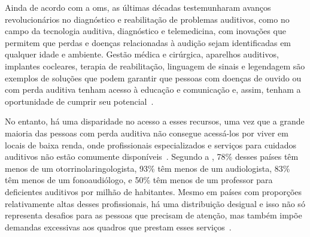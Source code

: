 Ainda de acordo com a \acrshort{oms}, as últimas décadas testemunharam avanços revolucionários no diagnóstico e reabilitação de problemas auditivos, como no campo da tecnologia auditiva, diagnóstico e telemedicina, com inovações que permitem que perdas e doenças relacionadas à audição sejam identificadas em qualquer idade e ambiente. Gestão médica e cirúrgica, aparelhos auditivos, implantes cocleares, terapia de reabilitação, linguagem de sinais e legendagem são exemplos de soluções que podem garantir que pessoas com doenças de ouvido ou com perda auditiva tenham acesso à educação e comunicação e, assim, tenham a oportunidade de cumprir seu potencial~\cite{who-2021-report-hearing}.



No entanto, há uma disparidade no acesso a esses recursos, uma vez que a grande maioria das pessoas com perda auditiva não consegue acessá-los por viver em locais de baixa renda, onde profissionais especializados e serviços para cuidados auditivos não estão comumente disponíveis~\cite{who-2021-report-hearing}. Segundo a , 78\% desses países têm menos de um otorrinolaringologista, 93\% têm menos de um audiologista, 83\% têm menos de um fonoaudiólogo, e 50\% têm menos de um professor para deficientes auditivos por milhão de habitantes. Mesmo em países com proporções relativamente altas desses profissionais, há uma distribuição desigual e isso não só representa desafios para as pessoas que precisam de atenção, mas também impõe demandas excessivas aos quadros que prestam esses serviços~\cite{opas-2021-oms-estima}.



